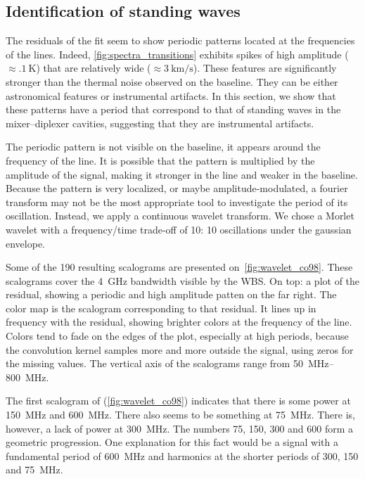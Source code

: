 \subsection{Identification of standing waves}
The residuals of the fit seem to show periodic patterns located at the frequencies of the lines.
Indeed, \cref{fig:spectra_transitions} exhibits spikes
of high amplitude ($\approx\SI{.1}{\kelvin}$)
that are relatively wide ($\approx \SI{3}{\kilo\meter\per\second}$).
These features are significantly stronger than the thermal noise observed on the baseline.
They can be either astronomical features or instrumental artifacts.
In this section, we show that these patterns have a period that correspond to that of standing waves in the mixer--diplexer cavities, suggesting that they are instrumental artifacts.

The periodic pattern is not visible on the baseline, it appears around the frequency of the line.
It is possible that the pattern is multiplied by the amplitude of the signal, making it stronger in the line and weaker in the baseline.
Because the pattern is very localized, or maybe amplitude-modulated, a fourier transform may not be the most appropriate tool to investigate the period of its oscillation.
Instead, we apply a continuous wavelet transform.
We chose a Morlet wavelet with a frequency/time trade-off of 10: 10 oscillations under the gaussian envelope.

Some of the 190 resulting scalograms are presented on~\cref{fig:wavelet_co98}.
These scalograms cover the \SI{4}{\giga\hertz} bandwidth visible by the WBS.
On top: a plot of the residual, showing a periodic and high amplitude patten on the far right.
The color map is the scalogram corresponding to that residual.
It lines up in frequency with the residual, showing brighter colors at the frequency of the line.
Colors tend to fade on the edges of the plot, especially at high periods, because the convolution kernel samples more and more outside the signal, using zeros for the missing values.
The vertical axis of the scalograms range from \SIrange{50}{800}{\mega\hertz}.

The first scalogram of  (\cref{fig:wavelet_co98}) indicates that there is some power at \SI{150}{\mega\hertz} and \SI{600}{\mega\hertz}.  There also seems to be something at \SI{75}{\mega\hertz}.
There is, however, a lack of power at \SI{300}{\mega\hertz}.
The numbers 75, 150, 300 and 600 form a geometric progression.
One explanation for this fact would be a signal with a fundamental period of \SI{600}{\mega\hertz} and harmonics at the shorter periods of \num{300}, \num{150} and \SI{75}{\mega\hertz}.


